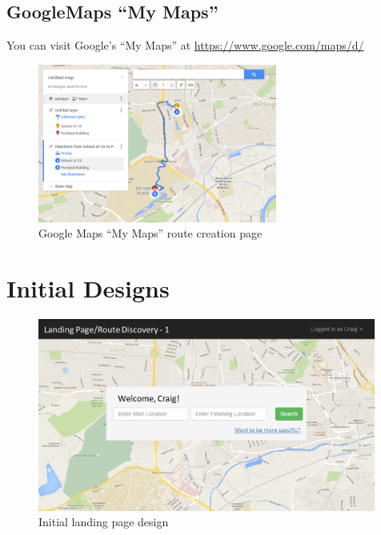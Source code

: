 \documentclass[a4paper,twoside,notitlepage,11pt]{article}
\begin{document}
\subsection{GoogleMaps ``My Maps''} 
You can visit Google's ``My Maps'' at \url{https://www.google.com/maps/d/}
\begin{figure}[!ht]
	\begin{center}
		\includegraphics[width=0.7\textwidth]{images/google_maps.png}
	\end{center}
	\vspace{-6mm}
	\caption{Google Maps ``My Maps'' route creation page}
\end{figure}

\section{Initial Designs}
\label{app-designs}

\begin{figure}[!ht]
	\begin{center}
			\includegraphics[width=0.99\textwidth]{images/ui-landing-1.png}
	\end{center}
	\vspace{-6mm}
	\caption{Initial landing page design}
\end{figure}
\end{document}
